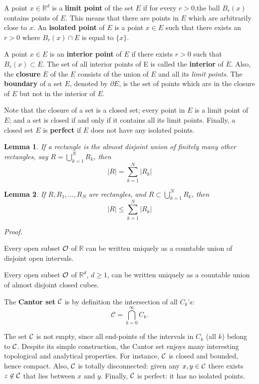 \documentclass[
]{book}
\newtheorem{lemma}{Lemma}[chapter]
\theoremstyle{definition}
\theoremstyle{definition}
\theoremstyle{definition}
\theoremstyle{definition}
\theoremstyle{remark}
\begin{document}
A point \(x\in \mathbb{R}^d\) is a \textbf{limit point} of the set \(E\) if for every \(r>0\),the ball \(B_r(x)\) contains points of \(E\). This means that there are points in \(E\) which are arbitrarily close to \(x\). An \textbf{isolated point} of \(E\) is a point \(x\in E\) such that there exists an \(r > 0\) where \(B_r(x)\cap E\) is equal to \(\{x\}\).

A point \(x\in E\) is an \textbf{interior point} of \(E\) if there exists \(r>0\) such that \(B_r(x)\subset E\). The set of all interior points of E is called the \textbf{interior} of \(E\). Also, the \textbf{closure} \(\overline{E}\) of the \(E\) consists of the union of \(E\) and all its \emph{limit points}. The \textbf{boundary} of a set \(E\), denoted by \(\partial E\), is the set of points which are in the closure of \(E\) but not in the interior of \(E\).

Note that the closure of a set is a closed set; every point in \(E\) is a limit point of \(E\); and a set is closed if and only if it contains all its limit points. Finally, a closed set \(E\) is \textbf{perfect} if \(E\) does not have any isolated points.

\begin{lemma}
If a rectangle is the almost disjoint union of finitely many other rectangles, say \(R=\bigcup_{k=1}^NR_k\), then
\[
|R|=\sum_{k=1}^N |R_k|
\]
\end{lemma}

\begin{lemma}
If \(R,R_1,\dots,R_N\) are rectangles, and \(R\subset\bigcup_{k=1}^NR_k\), then
\[
|R|\leq\sum_{k=1}^N |R_k|
\]
\end{lemma}

\emph{Proof.}

Every open subset \(\cal{O}\) of \(\mathbb{R}\) can be written uniquely as a countable union of disjoint open intervals.

Every open subset \(\cal{O}\) of \(\mathbb{R}^d\), \(d\geq 1\), can be written uniquely as a countable union of almost disjoint closed cubes.

The \textbf{Cantor set} \(\cal{C}\) is by definition the intersection of all \(C_k\)'s:
\[
\mathcal{C}=\bigcap_{k=0}^{\infty}C_k.
\]

The set \(\cal{C}\) is not empty, since all end-points of the intervals in \(C_k\) (all \(k\)) belong to \(\cal{C}\).
Despite its simple construction, the Cantor set enjoys many interesting topological and analytical properties. For instance, \(\cal{C}\) is closed and bounded, hence compact. Also, \(\cal{C}\) is totally disconnected: given any \(x,y\in \cal{C}\) there exists \(z\not\in \cal{C}\) that lies between \(x\) and \(y\). Finally, \(\cal{C}\) is perfect: it has no isolated points.
\end{document}
